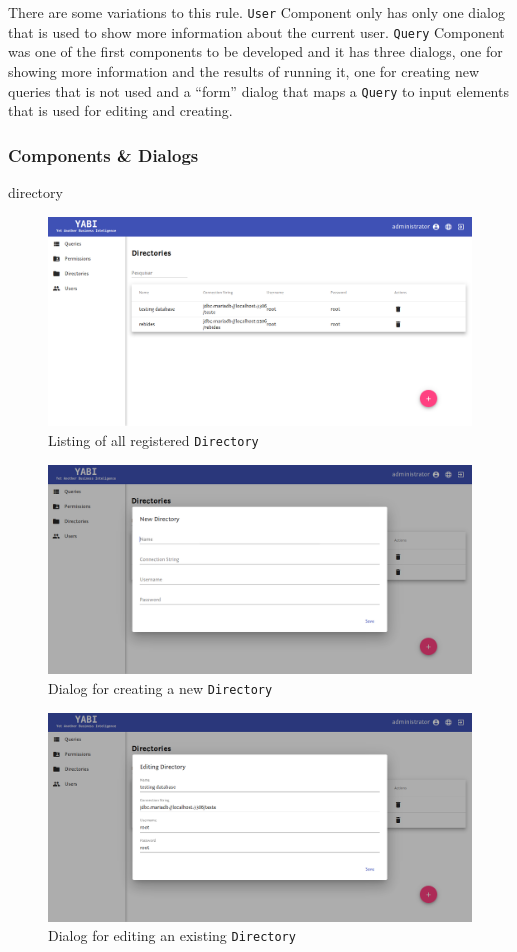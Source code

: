 There are some variations to this rule. \texttt{User} Component only has only one dialog that is used to show more information about the current user. \texttt{Query} Component was one of the first components to be developed and it has three dialogs, one for showing more information and the results of running it, one for creating new queries that is not used and a ``form'' dialog that maps a \texttt{Query} to input elements that is used for editing and creating.

\subsubsection{Components \& Dialogs}


directory
\begin{figure}
  \centering
  \includegraphics[width=.8\textwidth]{images/screenshots/directory/directory-listing}
  \caption{Listing of all registered \texttt{Directory}}\label{fig:dirlist}
\end{figure}

\begin{figure}
  \centering
  \includegraphics[width=.8\textwidth]{images/screenshots/directory/directory-new}
  \caption{Dialog for creating a new \texttt{Directory}}\label{fig:dirnew}
\end{figure}

\begin{figure}
  \centering
  \includegraphics[width=.8\textwidth]{images/screenshots/directory/directory-edit}
  \caption{Dialog for editing an existing \texttt{Directory}}\label{fig:diredit}
\end{figure}

